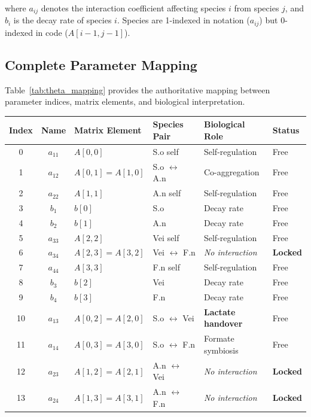 \documentclass[11pt,a4paper]{article}
\begin{document}
\noindent where $a_{ij}$ denotes the interaction coefficient affecting species $i$ from species $j$, and $b_i$ is the decay rate of species $i$. Species are 1-indexed in notation ($a_{ij}$) but 0-indexed in code ($A[i-1,j-1]$).

\subsection{Complete Parameter Mapping}

Table~\ref{tab:theta_mapping} provides the authoritative mapping between parameter indices, matrix elements, and biological interpretation.

\begin{table}[h]
\centering
\small
\begin{tabular}{ccllll}
\toprule
\textbf{Index} & \textbf{Name} & \textbf{Matrix Element} & \textbf{Species Pair} & \textbf{Biological Role} & \textbf{Status} \\
\midrule
0 & $a_{11}$ & $A[0,0]$ & S.o self & Self-regulation & Free \\
1 & $a_{12}$ & $A[0,1]=A[1,0]$ & S.o $\leftrightarrow$ A.n & Co-aggregation & Free \\
2 & $a_{22}$ & $A[1,1]$ & A.n self & Self-regulation & Free \\
3 & $b_1$ & $b[0]$ & S.o & Decay rate & Free \\
4 & $b_2$ & $b[1]$ & A.n & Decay rate & Free \\
\midrule
5 & $a_{33}$ & $A[2,2]$ & Vei self & Self-regulation & Free \\
\rowcolor{red!15}
6 & $a_{34}$ & $A[2,3]=A[3,2]$ & Vei $\leftrightarrow$ F.n & \textit{No interaction} & \textbf{Locked} \\
7 & $a_{44}$ & $A[3,3]$ & F.n self & Self-regulation & Free \\
8 & $b_3$ & $b[2]$ & Vei & Decay rate & Free \\
9 & $b_4$ & $b[3]$ & F.n & Decay rate & Free \\
\midrule
10 & $a_{13}$ & $A[0,2]=A[2,0]$ & S.o $\leftrightarrow$ Vei & \textbf{Lactate handover} & Free \\
11 & $a_{14}$ & $A[0,3]=A[3,0]$ & S.o $\leftrightarrow$ F.n & Formate symbiosis & Free \\
\rowcolor{red!15}
12 & $a_{23}$ & $A[1,2]=A[2,1]$ & A.n $\leftrightarrow$ Vei & \textit{No interaction} & \textbf{Locked} \\
\rowcolor{red!15}
13 & $a_{24}$ & $A[1,3]=A[3,1]$ & A.n $\leftrightarrow$ F.n & \textit{No interaction} & \textbf{Locked} \\

\end{tabular}
\end{table}
\end{document}
